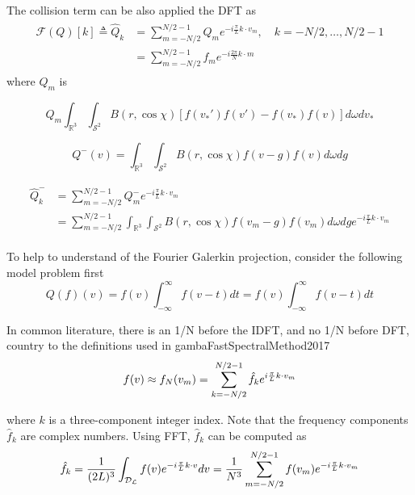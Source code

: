 \documentclass[11pt]{amsart}
\begin{document}
The collision term can be also applied the DFT as
\begin{align}
\begin{split}
\mathcal{F}(Q)[k] \triangleq \hat Q_k  &= \sum_{m=-N/2}^{N/2-1}Q_me^{-i \frac{\pi}{L}k\cdot v_m},\quad k = -N/2, \ldots, N/2-1 \\
&= \sum_{m=-N/2}^{N/2-1}f_me^{-i \frac{2\pi}{N}k\cdot m}
\end{split}
\end{align}
where $Q_m$ is

\begin{equation}
Q_m \int_{\mathbb{R}^3} \int_{\mathcal{S}^2} {B}(r,\cos\chi)[f(v_*')f(v')-f(v_*)f(v)] d\omega dv_* 
\end{equation}

\begin{equation}
Q^{-}(v) =  \int_{\mathbb{R}^3} \int_{\mathcal{S}^2} {B}(r,\cos\chi)f(v-g)f(v) d\omega dg
\end{equation}

\begin{align}
\begin{split}
\hat Q^{-}_k &= \sum_{m=-N/2}^{N/2-1} Q^{-}_me^{-i\frac{\pi}{L}k\cdot v_m}  \\
&=\sum_{m=-N/2}^{N/2-1}\int_{\mathbb{R}^3} \int_{\mathcal{S}^2} {B}(r,\cos\chi)f(v_m-g)f(v_m) d\omega dg e^{-i\frac{\pi}{L}k\cdot v_m} 
\end{split}
\end{align}

To help to understand of the Fourier Galerkin projection, consider the following model problem first
\begin{equation}
Q(f)(v) =f(v) \int_{-\infty}^{\infty}f(v-t)dt = f(v) \int_{-\infty}^{\infty}f(v-t)dt
\end{equation}


\color{red}
 In common literature, there is an 1/N before the IDFT, and no 1/N before DFT, country to the definitions used in gambaFastSpectralMethod2017
\begin{equation}
f(v) \approx f_N(v_m)  =  \sum_{k = -N/2}^{N/2-1}\hat f_k e^{i{\pi \over L}k\cdot v_m}
\end{equation}


where $k$ is a three-component integer index. Note that the frequency components $\hat f_k$ are complex numbers. Using FFT, $\hat f_k$ can be computed as
\begin{equation}
\hat f_k = \frac{1}{(2L)^3}\int_\mathcal{D_L} f(v) e^{-i {\pi \over L} k \cdot v}dv = \frac{1}{N^3} \sum_{m=-N/2}^{N/2-1}f(v_m)e^{-i \frac{\pi}{L}k\cdot v_m}
\end{equation}
\end{document}
